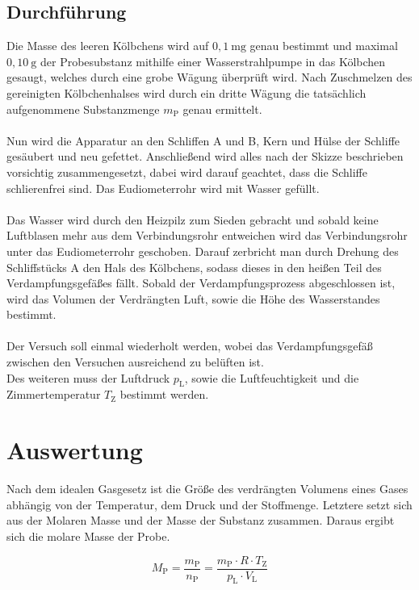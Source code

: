 \documentclass[12pt,a4paper,titlepage,headinclude,bibtotoc]{scrartcl}
\begin{document}
\subsection{Durchführung}
Die Masse des leeren Kölbchens wird auf $0,1 {~} \mathrm{mg}$ genau bestimmt und maximal $0,10{~}\mathrm{g}$ der Probesubstanz mithilfe einer Wasserstrahlpumpe in das Kölbchen gesaugt, welches durch eine grobe Wägung überprüft wird. Nach Zuschmelzen des gereinigten Kölbchenhalses wird durch ein dritte Wägung die tatsächlich aufgenommene Substanzmenge $m_{\mathrm{P}}$ genau ermittelt.\\\\
Nun wird die Apparatur an den Schliffen A und B, Kern und Hülse der Schliffe gesäubert und neu gefettet. Anschließend wird alles nach der Skizze beschrieben vorsichtig zusammengesetzt, dabei wird darauf geachtet, dass die Schliffe schlierenfrei sind. Das Eudiometerrohr wird mit Wasser gefüllt.\\\\
Das Wasser wird durch den Heizpilz zum Sieden gebracht und sobald keine Luftblasen mehr aus dem Verbindungsrohr entweichen wird das Verbindungsrohr unter das Eudiometerrohr geschoben. Darauf zerbricht man durch Drehung des Schliffstücks A den Hals des Kölbchens, sodass dieses in den heißen Teil des Verdampfungsgefäßes fällt. Sobald der Verdampfungsprozess abgeschlossen ist, wird das Volumen der Verdrängten Luft, sowie die Höhe des Wasserstandes bestimmt.\\\\
Der Versuch soll einmal wiederholt werden, wobei das Verdampfungsgefäß zwischen den Versuchen ausreichend zu belüften ist.\\
Des weiteren muss der Luftdruck $p_\mathrm{L}$, sowie die Luftfeuchtigkeit und die Zimmertemperatur $T_{\mathrm{Z}}$ bestimmt werden.     


\section{Auswertung}

Nach dem idealen Gasgesetz ist die Größe des verdrängten Volumens eines Gases abhängig von der Temperatur, dem Druck und der Stoffmenge. Letztere setzt sich aus der Molaren Masse und der Masse der Substanz zusammen. Daraus ergibt sich die molare Masse der Probe.

\begin{equation}
M_\mathrm{P} = \frac{m_\mathrm{P}}{n_\mathrm{P}} =\frac{m_\mathrm{P} \cdot R \cdot T_\mathrm{Z}}{p_\mathrm{L} \cdot V_\mathrm{L}}
\end{equation}
\end{document}
